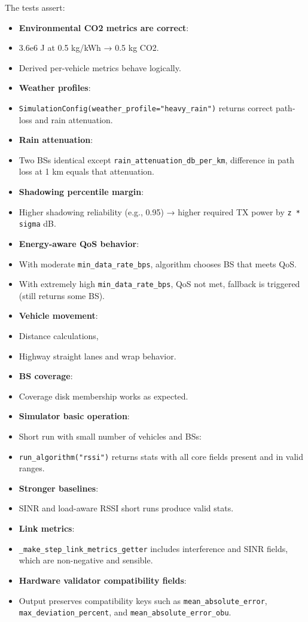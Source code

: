 \documentclass[conference]{IEEEtran}
\begin{document}
The tests assert:
\begin{itemize}
\item \textbf{Environmental CO2 metrics are correct}:
\item 3.6e6 J at 0.5 kg/kWh → 0.5 kg CO2.
\item Derived per-vehicle metrics behave logically.
\item \textbf{Weather profiles}:
\item \texttt{SimulationConfig(weather\_profile="heavy\_rain")} returns correct path-loss and rain attenuation.
\item \textbf{Rain attenuation}:
\item Two BSs identical except \texttt{rain\_attenuation\_db\_per\_km}, difference in path loss at 1 km equals that attenuation.
\item \textbf{Shadowing percentile margin}:
\item Higher shadowing reliability (e.g., 0.95) → higher required TX power by \texttt{z * sigma} dB.
\item \textbf{Energy-aware QoS behavior}:
\item With moderate \texttt{min\_data\_rate\_bps}, algorithm chooses BS that meets QoS.
\item With extremely high \texttt{min\_data\_rate\_bps}, QoS not met, fallback is triggered (still returns some BS).
\item \textbf{Vehicle movement}:
\item Distance calculations,
\item Highway straight lanes and wrap behavior.
\item \textbf{BS coverage}:
\item Coverage disk membership works as expected.
\item \textbf{Simulator basic operation}:
\item Short run with small number of vehicles and BSs:
\item \texttt{run\_algorithm("rssi")} returns stats with all core fields present and in valid ranges.
\item \textbf{Stronger baselines}:
\item SINR and load-aware RSSI short runs produce valid stats.
\item \textbf{Link metrics}:
\item \texttt{\_make\_step\_link\_metrics\_getter} includes interference and SINR fields, which are non-negative and sensible.
\item \textbf{Hardware validator compatibility fields}:
\item Output preserves compatibility keys such as \texttt{mean\_absolute\_error}, \texttt{max\_deviation\_percent}, and \texttt{mean\_absolute\_error\_obu}.
\end{itemize}
\end{document}
